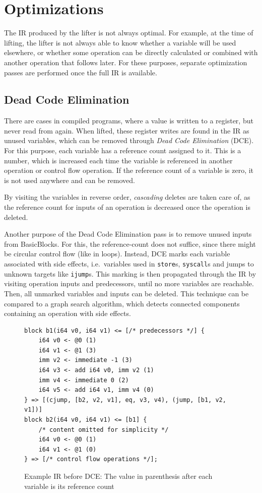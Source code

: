 \documentclass[course=eragp]{aspdoc}
\begin{document}
\section{Optimizations}\label{sec:optimizations}

The IR produced by the lifter is not always optimal. For example, at the time of lifting, the lifter is not always able
to know whether a variable will be used elsewhere, or whether some operation can be directly calculated or combined with
another operation that follows later. For these purposes, separate optimization passes are performed once the full IR is
available.

\subsection{Dead Code Elimination}\label{dead_code_elimination}

There are cases in compiled programs, where a value is written to a register, but never read from again.
When lifted, these register writes are found in the IR as unused variables, which can be removed through \emph{Dead Code
    Elimination} (DCE). For this purpose, each variable has a reference count assigned to it. This is a number, which is
increased each time the variable is referenced in another operation or control flow operation. If the reference count of
a variable is zero, it is not used anywhere and can be removed.

By visiting the variables in reverse order, \textit{cascading} deletes are taken care of, as the reference count for
inputs of an operation is decreased once the operation is deleted.

Another purpose of the Dead Code Elimination pass is to remove unused inputs from BasicBlocks. For this, the
reference-count does not suffice, since there might be circular control flow (like in loops). Instead, DCE marks each
variable associated with side effects, i.e.\ variables used in \texttt{store}s, \texttt{syscall}s and jumps to unknown
targets like \texttt{ijump}s. This marking is then propagated through the IR by visiting operation inputs and
predecessors, until no more variables are reachable. Then, all unmarked variables and inputs can be deleted. This
technique can be compared to a graph search algorithm, which detects connected components containing an operation with
side effects.

\begin{figure}[H]
    \centering
    \begin{lstlisting}[]
block b1(i64 v0, i64 v1) <= [/* predecessors */] {
    i64 v0 <- @0 (1)
    i64 v1 <- @1 (3)
    imm v2 <- immediate -1 (3)
    i64 v3 <- add i64 v0, imm v2 (1)
    imm v4 <- immediate 0 (2)
    i64 v5 <- add i64 v1, imm v4 (0)
} => [(cjump, [b2, v2, v1], eq, v3, v4), (jump, [b1, v2, v1])]
block b2(i64 v0, i64 v1) <= [b1] {
    /* content omitted for simplicity */
    i64 v0 <- @0 (1)
    i64 v1 <- @1 (0)
} => [/* control flow operations */];
\end{lstlisting}
    \caption{Example IR before DCE: The value in parenthesis after each variable is its reference count}\label{fig:dce_example_before}
\end{figure}
\end{document}
